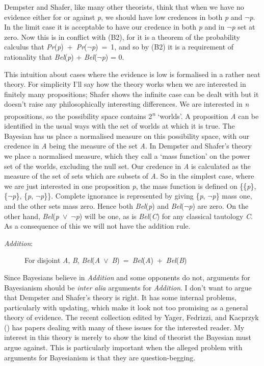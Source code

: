 \documentclass[
  10pt,
  letterpaper,
  DIV=11,
  numbers=noendperiod,
  twoside]{scrartcl}
\begin{document}
Dempster and Shafer, like many other theorists, think that when we have
no evidence either for or against \emph{p}, we should have low credences
in both \emph{p} and \({\lnot}\)\emph{p}. In the limit case it is
acceptable to have our credence in both \emph{p} and in
\({\lnot}\)\emph{p} set at zero. Now this is in conflict with (B2), for
it is a theorem of the probability calculus that
\emph{Pr}(\emph{p})~+~\emph{Pr}(\({\lnot}\)\emph{p})~=~1, and so by (B2)
it is a requirement of rationality that \emph{Bel}(\emph{p}) +
\emph{Bel}(\({\lnot}\)\emph{p}) = 0.

This intuition about cases where the evidence is low is formalised in a
rather neat theory. For simplicity I'll say how the theory works when we
are interested in finitely many propositions; Shafer shows the infinite
case can be dealt with but it doesn't raise any philosophically
interesting differences. We are interested in \emph{n} propositions, so
the possibility space contains 2\textsuperscript{\emph{n}} `worlds'. A
proposition \emph{A} can be identified in the usual ways with the set of
worlds at which it is true. The Bayesian has us place a normalised
measure on this possibility space, with our credence in \emph{A} being
the measure of the set \emph{A}. In Dempster and Shafer's theory we
place a normalised measure, which they call a `mass function' on the
power set of the worlds, excluding the null set. Our credence in
\emph{A} is calculated as the measure of the set of sets which are
subsets of \emph{A}. So in the simplest case, where we are just
interested in one proposition \emph{p}, the mass function is defined on
\{\{\emph{p}\}, \{\({\lnot}\)\emph{p}\}, \{\emph{p},
\({\lnot}\)\emph{p}\}\}. Complete ignorance is represented by giving
\{\emph{p}, \({\lnot}\)\emph{p}\} mass one, and the other sets mass
zero. Hence both \emph{Bel}(\emph{p}) and
\emph{Bel}(\({\lnot}\)\emph{p}) are zero. On the other hand,
\emph{Bel}(\emph{p}~\({\vee}\)~\({\lnot}\)\emph{p}) will be one, as is
\emph{Bel}(\emph{C}) for any classical tautology \emph{C}. As a
consequence of this we will not have the addition rule.

\begin{description}
\item[\emph{Addition}:]
For disjoint \emph{A}, \emph{B},
\emph{Bel}(\emph{A}~\({\vee}\)~\emph{B})~=~\emph{Bel}(\emph{A})~+~\emph{Bel}(\emph{B})
\end{description}

Since Bayesians believe in \emph{Addition} and some opponents do not,
arguments for Bayesianism should be \emph{inter alia} arguments for
\emph{Addition}. I don't want to argue that Dempster and Shafer's theory
is right. It has some internal problems, particularly with updating,
which make it look not too promising as a general theory of evidence.
The recent collection edited by Yager, Fedrizzi, and Kacprzyk
() has papers dealing with many of these
issues for the interested reader. My interest in this theory is merely
to show the kind of theorist the Bayesian must argue against. This is
particularly important when the alleged problem with arguments for
Bayesianism is that they are question-begging.
\end{document}
